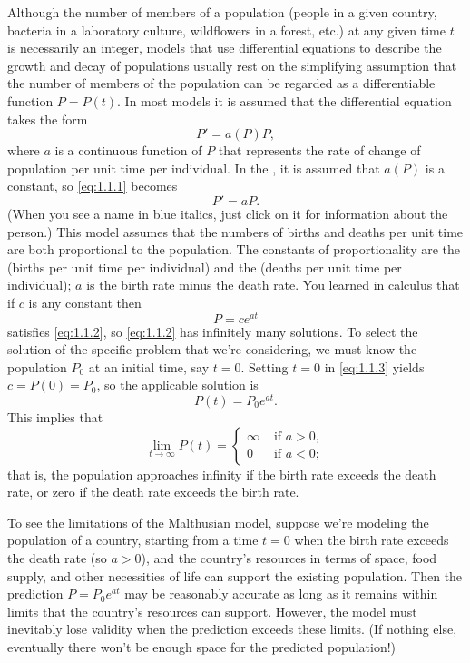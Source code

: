 \noindent
Although the number of members of a population (people in a given
country, bacteria in a laboratory culture, wildflowers in a forest,
etc.)
at any given time $t$ is necessarily an integer, models that use
differential equations to describe the growth and decay of populations
usually rest on the simplifying assumption that the number of members of
the population can be regarded as a differentiable function $P=P(t)$.
In most models it is assumed that the differential equation takes the
form
\begin{equation}\label{eq:1.1.1}
P'=a(P)P,
\end{equation}
where $a$ is a continuous function of $P$ that represents the rate of
change of population per unit time per individual.
In the
,
 it is assumed that
$a(P)$ is a constant, so \eqref{eq:1.1.1} becomes
\begin{equation} \label{eq:1.1.2}
P'=aP.
\end{equation}
{\color{blue}
(When you see a name in blue italics, just click on it for
information about the person.)}
This model assumes that the numbers of births and deaths per unit time
are both proportional to the population. The constants of
proportionality are  the  (births per unit
time per individual) and the  (deaths per unit time
per individual);     $a$ is the birth rate minus the death rate.
You  learned in calculus that if $c$ is any constant then
\begin{equation} \label{eq:1.1.3}
P=ce^{at}
\end{equation}
satisfies \eqref{eq:1.1.2}, so \eqref{eq:1.1.2} has infinitely
many solutions. To select the solution of the specific problem that
we're considering, we must know the population $P_0$ at an initial
time, say $t=0$. Setting $t=0$ in \eqref{eq:1.1.3} yields
$c=P(0)=P_0$, so the applicable solution is
\[
P(t)=P_0e^{at}.
\]
This implies that
\[
\lim_{t\to\infty}P(t)=
\begin{cases}
\infty&\text{ if }a>0,\\
0&\text{ if }a<0;
\end{cases}
\]
that is, the population approaches infinity if the birth rate exceeds
the death rate, or zero if the death rate exceeds the birth rate.

To see the limitations of the Malthusian model, suppose  we're
modeling the  population of a country, starting from a time
$t=0$ when the birth rate exceeds the death rate (so $a>0$), and
the country's resources in terms of space, food supply, and other
necessities of life can support the existing population. Then the
prediction $P=P_0e^{at}$ may be reasonably accurate as long as
it remains within limits that the country's resources can support.
However, the model must inevitably lose validity when the prediction
exceeds these limits. (If nothing else, eventually there won't be
enough space for the predicted population!)

